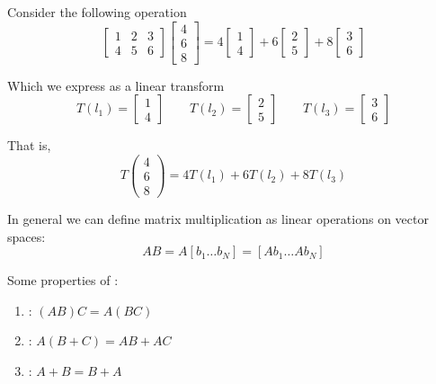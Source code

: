 \documentclass{article}
\begin{document}
\begin{example}
  Consider the following operation
  \[
    \left[\begin{matrix}
        1 & 2 & 3 \\
        4 & 5 & 6
    \end{matrix}\right]
    \left[\begin{matrix}
        4 \\ 6 \\ 8
    \end{matrix}\right]
    =
    4 \left[\begin{matrix}
        1 \\
        4
    \end{matrix}\right]
    +
    6 \left[\begin{matrix}
        2 \\
        5
    \end{matrix}\right]
    +
    8 \left[\begin{matrix}
        3 \\
        6
    \end{matrix}\right]
  \]

  Which we express as a linear transform
  \[
    T(l_1) = \left[\begin{matrix}
        1 \\
        4
    \end{matrix}\right]
    \quad\quad
    T(l_2) =  \left[\begin{matrix}
        2 \\
        5
    \end{matrix}\right]
    \quad\quad
    T(l_3) = \left[\begin{matrix}
        3 \\
        6
    \end{matrix}\right]
  \]

  That is,
  \[
    T\left(\begin{matrix}
    4 \\ 6 \\ 8
    \end{matrix}\right)
    =
    4 T(l_1)
    + 6 T(l_2)
    + 8 T(l_3)
  \]
\end{example}

In general we can define matrix multiplication as linear operations on vector spaces:
\[
  A B = A [b_1 \ldots b_N] = \left[A b_1 \ldots Ab_N\right]
\]

Some properties of :
\begin{enumerate}
  \item {}: $(AB)C = A(BC)$
  \item {}: $A(B + C) = AB + AC$
  \item {}: $A + B = B + A$
\end{enumerate}
\end{document}
